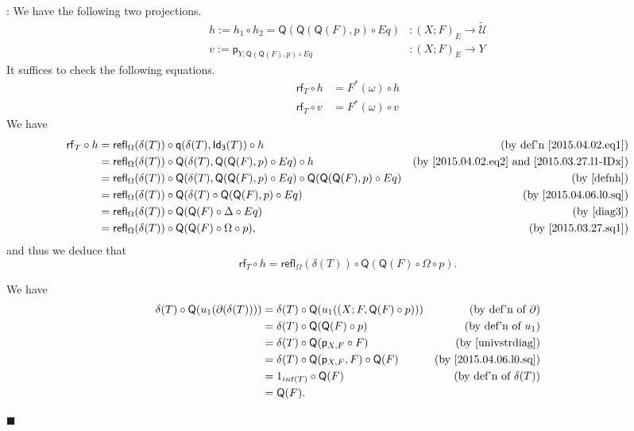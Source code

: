 \documentclass[12pt]{article}
\numberwithin{equation}{section}
\newenvironment{eq}{\begin{equation}}{\end{equation}}
\newenvironment{myproof}{{\bf Proof}:}{$\blacksquare$ \vskip 5mm }
\newcommand{\by}[1]{\text{(by #1)}}
\newcommand{\sr}{\rightarrow}
\newcommand{\wt}{\widetilde}
\newcommand{\id}{1}            %
\newcommand{\p}{\mathsf{p}}
\newcommand{\q}{\mathsf{q}}
\newcommand{\Idx}{\mathsf{Id_3}} %
\newcommand{\refl}{\mathsf{refl}}
\newcommand{\U}{\mathcal{U}}
\newcommand{\rf}{\mathsf{rf}}
\newcommand{\Q}{\mathsf{Q}}
\begin{document}
\begin{myproof}
We have the following two projections.
%
\begin{align}
  h := h_1\circ h_2=\Q(\Q(\Q(F),p)\circ Eq)&:(X;F)_{E}\sr \wt{\U} \label{defnh} \\
  v := \p_{Y,\Q(\Q(F),p)\circ Eq}&:(X;F)_{E} \sr Y                \label{defnv}
\end{align}
%
It suffices to check the following equations.
%
\begin{align*}
  \rf_T\circ h &=F^*(\omega)\circ h \\
  \rf_T\circ v &=F^*(\omega)\circ v
\end{align*}
%
We have
%
\begin{align*}
  \rf_T \circ h
  & = \refl_\Omega(\delta(T))\circ \q(\delta(T),\Idx(T))         \circ h & \by{def'n \ref{2015.04.02.eq1}} \\
  & = \refl_\Omega(\delta(T))\circ \Q(\delta(T),\Q(\Q(F),p)      \circ Eq) \circ h & \by{\ref{2015.04.02.eq2} and \ref{2015.03.27.l1-IDx}} \\
  & = \refl_\Omega(\delta(T))\circ \Q(\delta(T),\Q(\Q(F),p)      \circ Eq) \circ \Q(\Q(\Q(F),p)\circ Eq) & \by{\ref{defnh}} \\
  & = \refl_\Omega(\delta(T))\circ \Q(\delta(T)\circ \Q(\Q(F),p) \circ Eq) & \by{\ref{2015.04.06.l0.sq}}\\
  & = \refl_\Omega(\delta(T))\circ \Q(\Q(F)\circ \Delta          \circ Eq) & \by{\ref{diag3}}\\
  & = \refl_\Omega(\delta(T))\circ \Q(\Q(F)\circ \Omega          \circ p), & \by{\ref{2015.03.27.sq1}}
\end{align*}
and thus we deduce that
\begin{eq}
  \label{eqnrfth}
  \rf_T \circ h = \refl_\Omega(\delta(T))\circ \Q(\Q(F)\circ \Omega \circ p).
\end{eq}

%

We have
%
\begin{align*}
        \delta(T) \circ \Q(u_1(\partial(\delta(T)))) 
    & = \delta(T) \circ \Q(u_1((X;F,\Q(F) \circ p))) & \by{def'n of $\partial$} \\
    & = \delta(T) \circ \Q(\Q(F) \circ p)            & \by{def'n of $u_1$} \\
    & = \delta(T) \circ \Q(\p_{X,F} \circ F)         & \by{\ref{univstrdiag}} \\
    & = \delta(T) \circ \Q(\p_{X,F},F) \circ \Q(F)   & \by{\ref{2015.04.06.l0.sq}} \\
    & = \id_{int(T)} \circ \Q(F)                     & \by{def'n of $\delta(T)$} \\
    & = \Q(F).                                       &
\end{align*}
%


\end{myproof}
\end{document}
